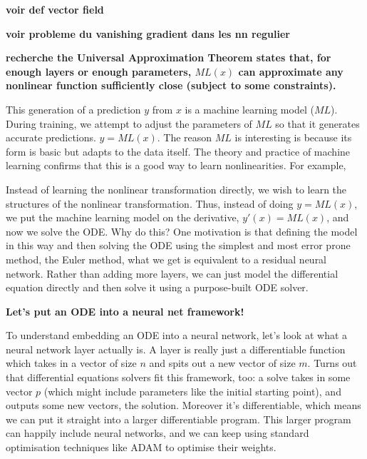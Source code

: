 \documentclass[10pt,a4paper]{article}
\theoremstyle{definition}
\theoremstyle{theorem}
\begin{document}
\textbf{voir def vector field}

\textbf{voir probleme du vanishing gradient dans les nn regulier}

\textbf{ recherche the Universal Approximation Theorem states that, for enough layers or enough parameters, $ML(x)$ can approximate any nonlinear function sufficiently close (subject to some constraints).}








This generation of a prediction $y$ from $x$ is a machine learning model ($ML$). During training, we attempt to adjust the parameters of $ML$ so that it generates accurate predictions. $y = ML(x)$. The reason $ML$ is interesting is because its form is basic but adapts to the data itself. The theory and practice of machine learning confirms that this is a good way to learn nonlinearities.  For example, 



Instead of learning the nonlinear transformation directly, we wish to learn the structures of the nonlinear transformation. Thus, instead of doing $y = ML(x)$, we put the machine learning model on the derivative, $y'(x) = ML(x)$, and now we solve the ODE. Why do this? One motivation is that defining the model in this way and then solving the ODE using the simplest and most error prone method, the Euler method, what we get is equivalent to a residual neural network. Rather than adding more layers, we can just model the differential equation directly and then solve it using a purpose-built ODE solver. 

\textbf{Let's put an ODE into a neural net framework!}

To understand embedding an ODE into a neural network, let's look at what a neural network layer actually is. A layer is really just a differentiable function which takes in a vector of size $n$ and spits out a new vector of size $m$. 
Turns out that differential equations solvers fit this framework, too: a solve takes in some vector $p$ (which might include parameters like the initial starting point), and outputs some new vectors, the solution. Moreover it's differentiable, which means we can put it straight into a larger differentiable program. This larger program can happily include neural networks, and we can keep using standard optimisation techniques like ADAM to optimise their weights.
\end{document}
